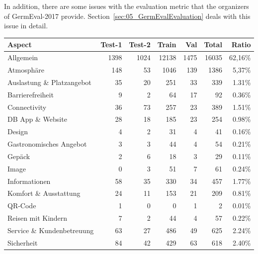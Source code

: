 In addition, there are some issues with the evaluation metric that the organizers of GermEval-2017 provide. Section~\ref{sec:05_GermEvalEvaluation} deals with this issue in detail.
\begin{table}
    \centering
    \begin{tabular}{lrrrrrr}
        \toprule
        Aspect                       & Test-1 & Test-2 & Train  & Val  & Total  & Ratio   \\ 
        \midrule
        Allgemein                    & 1398   & 1024   & 12138  & 1475 & 16035  & 62,16\% \\
        Atmosphäre                   & 148    & 53     & 1046   & 139  & 1386   & 5,37\%  \\
        Auslastung \& Platzangebot   & 35     & 20     & 251    & 33   & 339    & 1.31\%  \\
        Barrierefreiheit             & 9      & 2      & 64     & 17   & 92     & 0.36\%  \\
        Connectivity                 & 36     & 73     & 257    & 23   & 389    & 1.51\%  \\
        DB App \& Website            & 28     & 18     & 185    & 23   & 254    & 0.98\%  \\
        Design                       & 4      & 2      & 31     & 4    & 41     & 0.16\%  \\
        Gastronomisches Angebot      & 3      & 3      & 44     & 4    & 54     & 0.21\%  \\
        Gepäck                       & 2      & 6      & 18     & 3    & 29     & 0.11\%  \\
        Image                        & 0      & 3      & 51     & 7    & 61     & 0.24\%  \\
        Informationen                & 58     & 35     & 330    & 34   & 457    & 1.77\%  \\
        Komfort \& Ausstattung       & 24     & 11     & 153    & 21   & 209    & 0.81\%  \\
        QR-Code                      & 1      & 0      & 0      & 1    & 2      & 0.01\%  \\
        Reisen mit Kindern           & 7      & 2      & 44     & 4    & 57     & 0.22\%  \\
        Service \& Kundenbetreuung   & 63     & 27     & 486    & 49   & 625    & 2.24\%  \\
        Sicherheit                   & 84     & 42     & 429    & 63   & 618    & 2.40\%  \\

\end{tabular}
\end{table}
